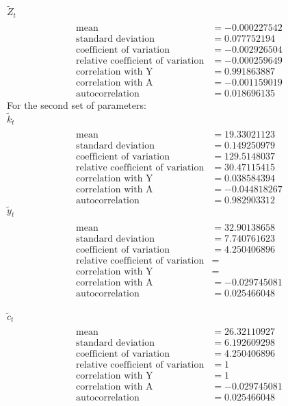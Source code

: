 \documentclass[letterpaper,12pt]{article}
\theoremstyle{definition}
\begin{document}
$\tilde{Z}_t$
\begin{align*}
\\\text{mean} &= -0.000227542
\\\text{standard deviation} &= 0.077752194
\\\text{coefficient of variation}&=	-0.002926504
\\\text{relative coefficient of variation}&=-0.000259649
\\\text{correlation with Y}&=0.991863887
\\\text{correlation with A}&=-0.001159019
\\\text{autocorrelation}&=0.018696135
\end{align*}
For the second set of parameters:\\
$\tilde{k}_t$
\begin{align*}
\\\text{mean} &= 19.33021123
\\\text{standard deviation} &= 0.149250979
\\\text{coefficient of variation}&=129.5148037
\\\text{relative coefficient of variation}&=30.47115415
\\\text{correlation with Y}&=0.038584394
\\\text{correlation with A}&=-0.044818267
\\\text{autocorrelation}&=0.982903312
\end{align*}
$\tilde{y}_t$
\begin{align*}
\\\text{mean} &= 32.90138658
\\\text{standard deviation} &= 7.740761623
\\\text{coefficient of variation}&=4.250406896
\\\text{relative coefficient of variation}&=
\\\text{correlation with Y}&=
\\\text{correlation with A}&=-0.029745081
\\\text{autocorrelation}&=0.025466048
\end{align*}
\\
$\tilde{c}_t$
\begin{align*}
\\\text{mean} &= 26.32110927
\\\text{standard deviation} &= 6.192609298
\\\text{coefficient of variation}&=4.250406896
\\\text{relative coefficient of variation}&=1
\\\text{correlation with Y}&=1
\\\text{correlation with A}&=-0.029745081
\\\text{autocorrelation}&=0.025466048
\end{align*}
\end{document}
